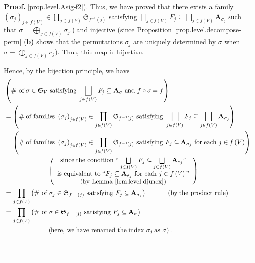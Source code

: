 \documentclass[numbers=enddot,12pt,final,onecolumn,notitlepage]{scrartcl}%
\numberwithin{exer}{section}
\theoremstyle{definition}
\newenvironment{proof}[1][Proof]{\noindent\textbf{#1.} }{\ \rule{0.5em}{0.5em}}
\let\prodnonlimits\prod
\let\sqcupnonlimits\bigsqcup
\let\oplusnonlimits\bigoplus
\renewcommand{\prod}{\prodnonlimits\limits}
\renewcommand{\bigsqcup}{\sqcupnonlimits\limits}
\renewcommand{\bigoplus}{\oplusnonlimits\limits}
\newenvironment{verlong}{}{}
\begin{document}
\begin{verlong}
\begin{proof}
{\ref{prop.level.Asig-f2}). Thus, we have proved that there exists a family
$\left(  \sigma_{j}\right)  _{j\in f\left(  V\right)  }\in\prod_{j\in f\left(
V\right)  }\mathfrak{S}_{f^{-1}\left(  j\right)  }$ satisfying $\bigsqcup
_{j\in f\left(  V\right)  }F_{j}\subseteq\bigsqcup_{j\in f\left(  V\right)
}\mathbf{A}_{\sigma_{j}}$ such that $\sigma=\bigoplus_{j\in f\left(  V\right)
}\sigma_{j}$.}) and injective (since Proposition
\ref{prop.level.decompose-perm} \textbf{(b)} shows that the permutations
$\sigma_{j}$ are uniquely determined by $\sigma$ when $\sigma=\bigoplus_{j\in
f\left(  V\right)  }\sigma_{j}$). Thus, this map is bijective.

Hence, by the bijection principle, we have%
\begin{align}
&  \left(  \text{\# of }\sigma\in\mathfrak{S}_{V}\text{ satisfying }%
\bigsqcup_{j\in f\left(  V\right)  }F_{j}\subseteq\mathbf{A}_{\sigma}\text{
and }f\circ\sigma=f\right) \nonumber\\
&  =\left(  \text{\# of families }\left(  \sigma_{j}\right)  _{j\in f\left(
V\right)  }\in\prod_{j\in f\left(  V\right)  }\mathfrak{S}_{f^{-1}\left(
j\right)  }\text{ satisfying }\bigsqcup_{j\in f\left(  V\right)  }%
F_{j}\subseteq\bigsqcup_{j\in f\left(  V\right)  }\mathbf{A}_{\sigma_{j}%
}\right) \nonumber\\
&  =\left(  \text{\# of families }\left(  \sigma_{j}\right)  _{j\in f\left(
V\right)  }\in\prod_{j\in f\left(  V\right)  }\mathfrak{S}_{f^{-1}\left(
j\right)  }\text{ satisfying }F_{j}\subseteq\mathbf{A}_{\sigma_{j}}\text{ for
each }j\in f\left(  V\right)  \right) \nonumber\\
&  \ \ \ \ \ \ \ \ \ \ \ \ \ \ \ \ \ \ \ \ \left(
\begin{array}
[c]{c}%
\text{since the condition \textquotedblleft}\bigsqcup_{j\in f\left(  V\right)
}F_{j}\subseteq\bigsqcup_{j\in f\left(  V\right)  }\mathbf{A}_{\sigma_{j}%
}\text{\textquotedblright}\\
\text{is equivalent to \textquotedblleft}F_{j}\subseteq\mathbf{A}_{\sigma_{j}%
}\text{ for each }j\in f\left(  V\right)  \text{\textquotedblright}\\
\text{(by Lemma \ref{lem.level.djunex})}%
\end{array}
\right) \nonumber\\
&  =\prod_{j\in f\left(  V\right)  }\left(  \text{\# of }\sigma_{j}%
\in\mathfrak{S}_{f^{-1}\left(  j\right)  }\text{ satisfying }F_{j}%
\subseteq\mathbf{A}_{\sigma_{j}}\right)  \ \ \ \ \ \ \ \ \ \ \left(  \text{by
the product rule}\right) \nonumber\\
&  =\prod_{j\in f\left(  V\right)  }\left(  \text{\# of }\sigma\in
\mathfrak{S}_{f^{-1}\left(  j\right)  }\text{ satisfying }F_{j}\subseteq
\mathbf{A}_{\sigma}\right) \label{pf.lem.hamps-by-lin-f.6}\\
&  \ \ \ \ \ \ \ \ \ \ \ \ \ \ \ \ \ \ \ \ \left(  \text{here, we have renamed
the index }\sigma_{j}\text{ as }\sigma\right)  .\nonumber
\end{align}



\end{proof}
\end{verlong}
\end{document}

